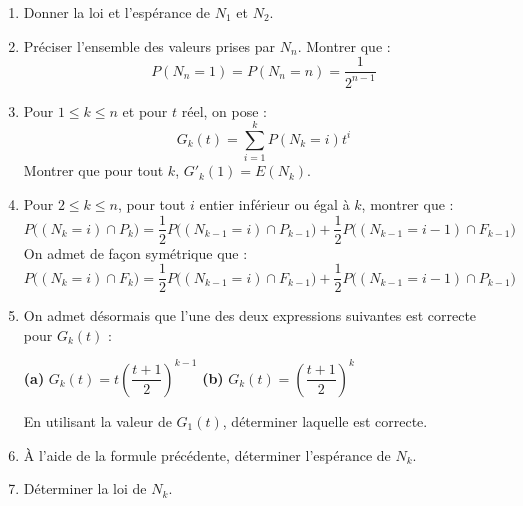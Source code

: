 \begin{enumerate}
    \item Donner la loi et l'espérance de $N_1$ et $N_2$.
    \item Préciser l'ensemble des valeurs prises par $N_n$. Montrer que :
    $$P(N_n=1)=P(N_n=n)=\frac{1}{2^{n-1}}$$
    \item Pour $1\leq k \leq n$ et pour $t$ réel, on pose :
    $$G_k(t)=\sum_{i=1}^k P(N_k=i)t^i$$
    Montrer que pour tout $k$, $G'_k(1)=E(N_k)$.
    \item Pour $2\leq k \leq n$, pour tout $i$ entier inférieur ou égal à $k$, montrer que :
    $$P\big((N_k=i)\cap P_k\big)=\frac{1}{2}P\big((N_{k-1}=i)\cap P_{k-1}\big)+\frac{1}{2}P\big((N_{k-1}=i-1)\cap F_{k-1}\big)$$
    On admet de façon symétrique que :
    $$P\big((N_k=i)\cap F_k\big)=\frac{1}{2}P\big((N_{k-1}=i)\cap F_{k-1}\big)+\frac{1}{2}P\big((N_{k-1}=i-1)\cap P_{k-1}\big)$$
    \item On admet désormais que l'une des deux expressions suivantes est correcte pour $G_k(t)$ :
    \begin{center}
        \textbf{(a)} \quad $G_k(t)=t\left(\dfrac{t+1}{2}\right)^{k-1}$ \qquad\qquad
        \textbf{(b)} \quad $G_k(t)=\left(\dfrac{t+1}{2}\right)^{k}$
    \end{center}
    En utilisant la valeur de $G_1(t)$, déterminer laquelle est correcte.
    \item À l'aide de la formule précédente, déterminer l'espérance de $N_k$.
    \item Déterminer la loi de $N_k$.
\end{enumerate}

